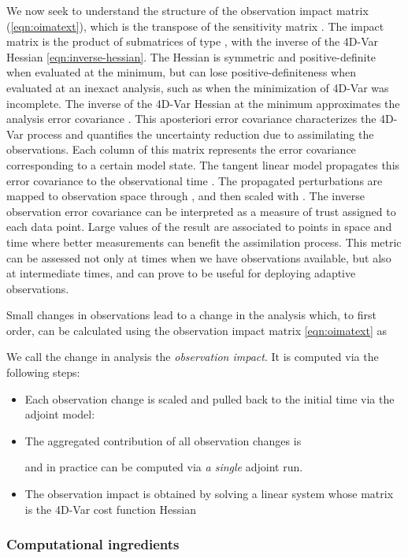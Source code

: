 \documentclass[final,sort&compress]{elsarticle}
\begin{document}
We now seek to understand the structure of the observation impact matrix (\ref{eqn:oimatext}), 
which is the transpose of the sensitivity matrix .
The impact matrix is the product of submatrices of type , with
the inverse of the 4D-Var Hessian \eqref{eqn:inverse-hessian}. 
The Hessian is symmetric and positive-definite when evaluated at the minimum, but can
lose positive-definiteness when evaluated at an inexact analysis, such as when the minimization of 4D-Var
was incomplete. The inverse of the 4D-Var Hessian at the minimum approximates the analysis error covariance \cite{gejadze2008analysis}.
This aposteriori error covariance characterizes the 4D-Var process and quantifies the uncertainty reduction due to assimilating the observations. 
Each column of this matrix represents the error covariance corresponding to a certain model state. 
The tangent linear model  propagates this error covariance to the observational time .
The propagated perturbations are mapped to observation space through , and then scaled with . 
The inverse observation error covariance can be interpreted as a measure of trust assigned to each data point.
Large values of the result are associated to points in space and time where better measurements can benefit the assimilation process. 
This metric can be assessed not only at times when we have observations available, but also
at intermediate times, and can prove to be useful for deploying adaptive observations.

Small changes in observations  lead to a change in the analysis  which, to first order, can be calculated using the observation impact matrix \eqref{eqn:oimatext} as

We call the change in analysis  the {\em observation impact}.  It is computed via the following steps:
\begin{itemize}
\item Each observation change  is scaled and pulled back to the initial time via the adjoint model:

\item The aggregated contribution of all observation changes is

and in practice can be computed via {\em a single} adjoint run.
\item The observation impact is obtained by solving a linear system whose matrix is the 4D-Var cost function Hessian

\end{itemize}


\subsubsection{Computational ingredients}
\end{document}
